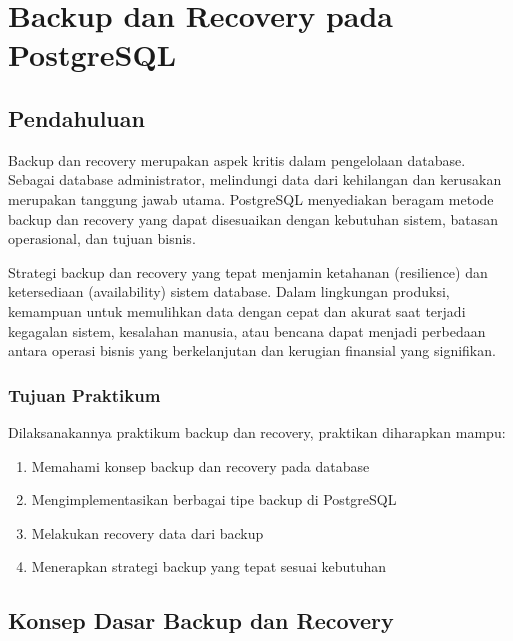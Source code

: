\chapter*{Backup dan Recovery pada PostgreSQL}
\setcounter{section}{0}
\section{Pendahuluan}
Backup dan recovery merupakan aspek kritis dalam pengelolaan database. Sebagai database administrator, melindungi data dari kehilangan dan kerusakan merupakan tanggung jawab utama. PostgreSQL menyediakan beragam metode backup dan recovery yang dapat disesuaikan dengan kebutuhan sistem, batasan operasional, dan tujuan bisnis.

Strategi backup dan recovery yang tepat menjamin ketahanan (resilience) dan ketersediaan (availability) sistem database. Dalam lingkungan produksi, kemampuan untuk memulihkan data dengan cepat dan akurat saat terjadi kegagalan sistem, kesalahan manusia, atau bencana dapat menjadi perbedaan antara operasi bisnis yang berkelanjutan dan kerugian finansial yang signifikan.

\subsection{Tujuan Praktikum}
Dilaksanakannya praktikum backup dan recovery, praktikan diharapkan mampu:
\begin{enumerate}
    \item Memahami konsep backup dan recovery pada database
    \item Mengimplementasikan berbagai tipe backup di PostgreSQL
    \item Melakukan recovery data dari backup
    \item Menerapkan strategi backup yang tepat sesuai kebutuhan
\end{enumerate}

\section{Konsep Dasar Backup dan Recovery}

